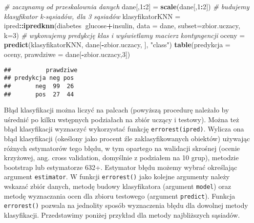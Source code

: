 \documentclass[polish,]{book}
\newenvironment{Shaded}{\begin{snugshade}}{\end{snugshade}}
\newcommand{\CommentTok}[1]{\textcolor[rgb]{0.56,0.35,0.01}{\textit{#1}}}
\newcommand{\DataTypeTok}[1]{\textcolor[rgb]{0.13,0.29,0.53}{#1}}
\newcommand{\DecValTok}[1]{\textcolor[rgb]{0.00,0.00,0.81}{#1}}
\newcommand{\KeywordTok}[1]{\textcolor[rgb]{0.13,0.29,0.53}{\textbf{#1}}}
\newcommand{\NormalTok}[1]{#1}
\newcommand{\OperatorTok}[1]{\textcolor[rgb]{0.81,0.36,0.00}{\textbf{#1}}}
\newcommand{\StringTok}[1]{\textcolor[rgb]{0.31,0.60,0.02}{#1}}
\begin{document}
\begin{Shaded}
\begin{Highlighting}[]
\CommentTok{# zaczynamy od przeskalownia danych}
\NormalTok{dane[,}\DecValTok{1}\OperatorTok{:}\DecValTok{2}\NormalTok{] =}\StringTok{ }\KeywordTok{scale}\NormalTok{(dane[,}\DecValTok{1}\OperatorTok{:}\DecValTok{2}\NormalTok{])}
\CommentTok{# budujemy klasyfikator k-sąsiadów, dla 3 sąsiadów}
\NormalTok{klasyfikatorKNN =}\StringTok{ }\NormalTok{ipred}\OperatorTok{::}\KeywordTok{ipredknn}\NormalTok{(diabetes}\OperatorTok{~}\NormalTok{glucose}\OperatorTok{+}\NormalTok{insulin, }
                                  \DataTypeTok{data =}\NormalTok{ dane, }\DataTypeTok{subset=}\NormalTok{zbior.uczacy, }\DataTypeTok{k=}\DecValTok{3}\NormalTok{)}
\CommentTok{# wykonujemy predykcję klas i wyświetlamy macierz kontyngencji}
\NormalTok{oceny =}\StringTok{ }\KeywordTok{predict}\NormalTok{(klasyfikatorKNN, dane[}\OperatorTok{-}\NormalTok{zbior.uczacy, ], }\StringTok{"class"}\NormalTok{)}
\KeywordTok{table}\NormalTok{(}\DataTypeTok{predykcja =}\NormalTok{ oceny, }\DataTypeTok{prawdziwe =}\NormalTok{ dane[}\OperatorTok{-}\NormalTok{zbior.uczacy,}\DecValTok{3}\NormalTok{])}
\end{Highlighting}
\end{Shaded}

\begin{verbatim}
##          prawdziwe
## predykcja neg pos
##       neg  99  26
##       pos  27  44
\end{verbatim}

Błąd klasyfikacji można liczyć na palcach (powyższą procedurę należało by uśrednić po kilku wstępnych podziałach na zbiór uczący i testowy). Można też błąd klasyfikacji wyznaczyć wykorzystać funkcję \texttt{errorest(ipred)}. Wylicza ona błąd klasyfikacji (okeślony jako procent źle zaklasyfikowanych obiektów) używając różnych
estymatorów tego błędu, w tym opartego na walidacji skrośnej (ocenie krzyżowej,
ang. cross validation, domyślnie z podziałem na 10 grup), metodzie bootstrap lub estymatorze 632+. Estymator błędu możemy wybrać określając argument \texttt{estimator}.
W funkcji \texttt{errorest()} jako kolejne argumenty należy wskazać zbiór danych, metodę
budowy klasyfikatora (argument \texttt{model}) oraz metodę wyznaczania ocen dla zbioru
testowego (argument \texttt{predict}). Funkcja \texttt{errorest()} pozwala na jednolity sposób
wyznaczenia błędu dla dowolnej metody klasyfikacji. Przedstawimy poniżej przykład
dla metody najbliższych sąsiadów.
\end{document}
